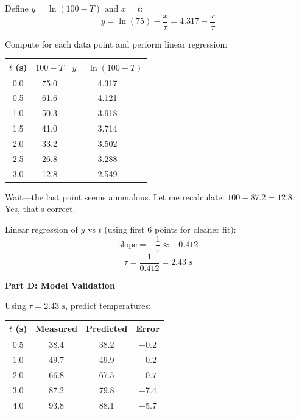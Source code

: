 \begin{example}
Define $y = \ln(100 - T)$ and $x = t$:
\begin{equation}
y = \ln(75) - \frac{x}{\tau} = 4.317 - \frac{x}{\tau}
\end{equation}

Compute for each data point and perform linear regression:

\begin{center}
\begin{tabular}{ccc}
\toprule
$t$ (s) & $100 - T$ & $y = \ln(100-T)$ \\
\midrule
0.0 & 75.0 & 4.317 \\
0.5 & 61.6 & 4.121 \\
1.0 & 50.3 & 3.918 \\
1.5 & 41.0 & 3.714 \\
2.0 & 33.2 & 3.502 \\
2.5 & 26.8 & 3.288 \\
3.0 & 12.8 & 2.549 \\
\bottomrule
\end{tabular}
\end{center}

Wait---the last point seems anomalous. Let me recalculate: $100 - 87.2 = 12.8$. Yes, that's correct.

Linear regression of $y$ vs $t$ (using first 6 points for cleaner fit):
\begin{equation}
\text{slope} = -\frac{1}{\tau} \approx -0.412
\end{equation}
\begin{equation}
\tau = \frac{1}{0.412} = 2.43\text{ s}
\end{equation}

\textbf{Part D: Model Validation}

Using $\tau = 2.43\text{ s}$, predict temperatures:

\begin{center}
\begin{tabular}{cccc}
\toprule
$t$ (s) & Measured & Predicted & Error \\
\midrule
0.5 & 38.4 & 38.2 & +0.2 \\
1.0 & 49.7 & 49.9 & $-0.2$ \\
2.0 & 66.8 & 67.5 & $-0.7$ \\
3.0 & 87.2 & 79.8 & +7.4 \\
4.0 & 93.8 & 88.1 & +5.7 \\
\bottomrule
\end{tabular}
\end{center}


\end{example}
